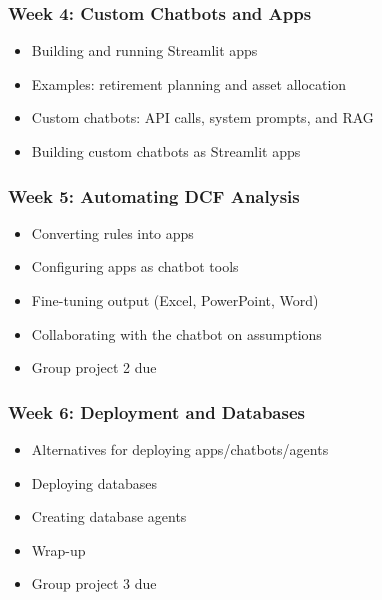 \documentclass[11pt]{article}
\begin{document}
\subsubsection*{Week 4: Custom Chatbots and Apps}
\begin{itemize}\setlength{\itemsep}{0pt}
\item Building and running Streamlit apps
\item Examples: retirement planning and asset allocation
\item Custom chatbots: API calls, system prompts, and RAG
\item Building custom chatbots as Streamlit apps
\end{itemize}

\subsubsection*{Week 5: Automating DCF Analysis}
\begin{itemize}\setlength{\itemsep}{0pt}
\item Converting rules into apps
\item Configuring apps as chatbot tools
\item Fine-tuning output (Excel, PowerPoint, Word) 
\item Collaborating with the chatbot on assumptions
\item Group project 2 due
\end{itemize}

\subsubsection*{Week 6: Deployment and Databases}
\begin{itemize}\setlength{\itemsep}{0pt}
\item Alternatives for deploying apps/chatbots/agents
\item Deploying databases
\item Creating database agents
\item Wrap-up
\item Group project 3 due
\end{itemize}
\end{document}
